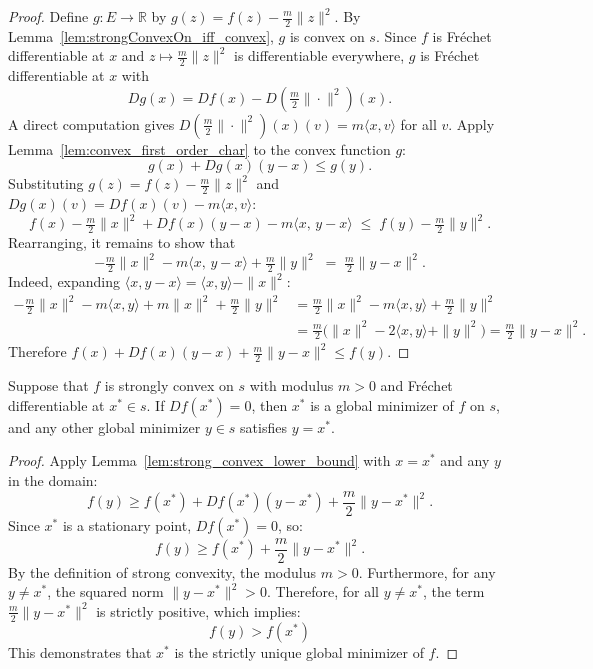 \begin{proof}
  \leanok{}
  Define $g : E \to \mathbb{R}$ by $g(z) = f(z) - \frac{m}{2}\|z\|^2$.
  By Lemma~\ref{lem:strongConvexOn_iff_convex}, $g$ is convex on $s$.
  Since $f$ is Fr\'echet differentiable at $x$ and $z \mapsto \frac{m}{2}\|z\|^2$ is
  differentiable everywhere, $g$ is Fr\'echet differentiable at $x$ with
  \[
    Dg(x) = Df(x) - D\!\left(\tfrac{m}{2}\|\cdot\|^2\right)(x).
  \]
  A direct computation gives $D\!\left(\frac{m}{2}\|\cdot\|^2\right)(x)(v) = m\langle x, v\rangle$
  for all $v$.
  Apply Lemma~\ref{lem:convex_first_order_char} to the convex function $g$:
  \[
    g(x) + Dg(x)(y - x) \le g(y).
  \]
  Substituting $g(z) = f(z) - \frac{m}{2}\|z\|^2$ and $Dg(x)(v) = Df(x)(v) - m\langle x, v\rangle$:
  \[
    f(x) - \tfrac{m}{2}\|x\|^2
    + Df(x)(y-x) - m\langle x,\, y-x\rangle
    \;\le\;
    f(y) - \tfrac{m}{2}\|y\|^2.
  \]
  Rearranging, it remains to show that
  \[
    -\tfrac{m}{2}\|x\|^2 - m\langle x,\, y-x\rangle + \tfrac{m}{2}\|y\|^2
    \;=\; \tfrac{m}{2}\|y - x\|^2.
  \]
  Indeed, expanding $\langle x, y-x\rangle = \langle x,y\rangle - \|x\|^2$:
  \begin{align*}
    -\tfrac{m}{2}\|x\|^2 - m\langle x,y\rangle + m\|x\|^2 + \tfrac{m}{2}\|y\|^2
    &= \tfrac{m}{2}\|x\|^2 - m\langle x,y\rangle + \tfrac{m}{2}\|y\|^2 \\
    &= \tfrac{m}{2}\bigl(\|x\|^2 - 2\langle x,y\rangle + \|y\|^2\bigr)
     = \tfrac{m}{2}\|y - x\|^2.
  \end{align*}
  Therefore $f(x) + Df(x)(y-x) + \frac{m}{2}\|y-x\|^2 \le f(y)$.
\end{proof}


\begin{theorem}\label{thm:unique_minimizer_strong_convex}
  \leanok{}
  Suppose that $f$ is strongly convex on $s$ with modulus $m > 0$ and Fr\'echet
  differentiable at $x^* \in s$. If $Df(x^*) = 0$, then $x^*$ is a global
  minimizer of $f$ on $s$, and any other global minimizer $y \in s$ satisfies
  $y = x^*$.
\end{theorem}

\begin{proof}
  \leanok{}
Apply Lemma~\ref{lem:strong_convex_lower_bound} with $x = x^*$ and any $y$ in the domain:
$$f(y) \geq f(x^*) + Df(x^*)(y-x^*) + \frac{m}{2}\|y-x^*\|^2.$$
Since $x^*$ is a stationary point, $Df(x^*) = 0$, so:
$$f(y) \geq f(x^*) + \frac{m}{2}\|y-x^*\|^2.$$
By the definition of strong convexity, the modulus $m > 0$. Furthermore, for any $y \neq x^*$, the squared norm $\|y-x^*\|^2 > 0$.
Therefore, for all $y \neq x^*$, the term $\frac{m}{2}\|y-x^*\|^2$ is strictly positive, which implies:
$$f(y) > f(x^*)$$
This demonstrates that $x^*$ is the strictly unique global minimizer of $f$.
\end{proof}

